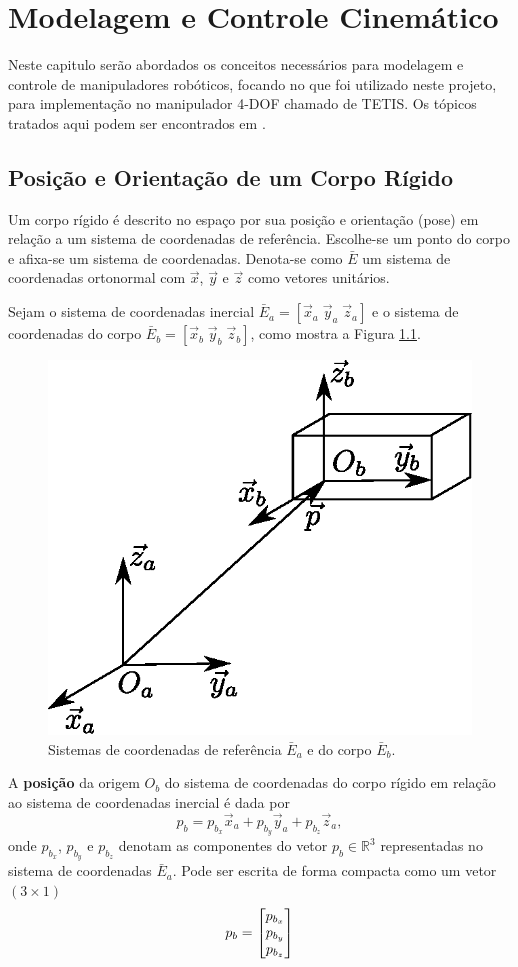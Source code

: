 \chapter{Modelagem e Controle Cinemático}
Neste capitulo serão abordados os conceitos necessários para modelagem e controle de manipuladores robóticos, focando no que foi utilizado neste projeto, para implementação no manipulador 4-DOF chamado de TETIS. Os tópicos tratados aqui podem ser encontrados em \citep{siciliano, petercorke}.

\section{Posição e Orientação de um Corpo Rígido}

Um corpo rígido é descrito no espaço por sua posição e orientação (pose) em relação a um sistema de coordenadas de referência. Escolhe-se um ponto do corpo e afixa-se um sistema de coordenadas. Denota-se como $\bar{E}$ um sistema de coordenadas ortonormal com $\vec{x}$, $\vec{y}$ e $\vec{z}$ como vetores unitários.

Sejam o sistema de coordenadas inercial $\bar{E}_a = [\vec{x}_a \; \vec{y}_a \; \vec{z}_a ]$ e o sistema de coordenadas do corpo $\bar{E}_b = [\vec{x}_b \; \vec{y}_b \; \vec{z}_b ]$, como mostra a Figura \ref{fig:pose_frames}.

\begin{figure}[!h]
  \centering
  \includegraphics[width=0.4\linewidth]{./img/pose_frames}
  \caption{Sistemas de coordenadas de referência $\bar{E}_a$ e do corpo $\bar{E}_b$.}
  \label{fig:pose_frames}
\end{figure}

A \textbf{posição} da origem $O_b$ do sistema de coordenadas do corpo rígido em relação ao sistema de coordenadas inercial é dada por 
\begin{equation}
p_b = p_{b_x} \vec{x}_a + p_{b_y} \vec{y}_a + p_{b_z} \vec{z}_a, 
\end{equation}
onde $p_{b_x}$, $p_{b_y}$ e $p_{b_z}$ denotam as componentes do vetor $p_b \in \mathbb{R}^3$ representadas no sistema de coordenadas $\bar{E}_a$. Pode ser escrita de forma compacta como um vetor $(3 \times 1)$
\begin{equation}
p_{b} = \begin{bmatrix}p_{b_x} \\ p_{b_y} \\ p_{b_z}\end{bmatrix}
\end{equation}

